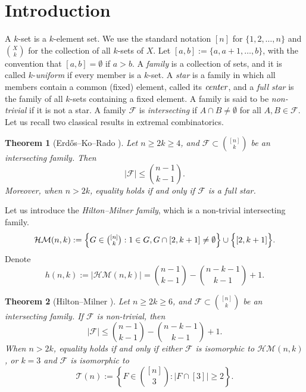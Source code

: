 \documentclass[a4paper,11pt]{article}
\newtheorem{theorem}{Theorem}[section]
\newcommand{\m}{\mathcal}
\begin{document}






\section{Introduction}
A $k$-set is a $k$-element set. 
We use the standard notation $[n]$ for $\{1,2,\dots,n\}$ and  ${X\choose k}$ for the collection of all $k$-sets of $X$. 
Let $[a,b]:=\{a, a+1, \dots, b\}$, with the convention that $[a,b]=\emptyset$ if $a>b$.  
A {\it family} is a collection of sets, and it is called $k$-{\it uniform} if every member is a $k$-set. 
A {\it star} is a family in which all members contain a common (fixed) element, called its ${\it center}$, and
a {\it full star} is the family of all $k$-sets containing a fixed element. 
A family is said to be {\it non-trivial} if it is not a star. 
A family $\m F$ is {\it intersecting} if $A\cap B\ne \emptyset$ for all $A, B \in \m F$. 
Let us recall two classical results in extremal combinatorics. 
 
\begin{theorem}[Erd\H{o}s--Ko--Rado \cite{EKR1961}]
Let $n\ge 2k\ge 4$,  and $\mathcal{F}\subset {[n] \choose k}$ be an intersecting family. Then
$$  |\mathcal{F}| \le {n-1 \choose k-1}.$$
 Moreover, when $n>2k$, equality holds if and only if $\mathcal{F}$ is a full star.
\end{theorem}

Let us introduce the {\it Hilton--Milner family}, which is a non-trivial intersecting family.  
\[ \begin{matrix}
\m {HM}(n,k):=
\Bigl\{G\in {[n] \choose k}: 
1\in G, G\cap [2,k+1] \neq \emptyset \Bigr\}
\cup \Bigl\{ [2,k+1]  \Bigr\}.
\end{matrix} \]
Denote 
\[
h(n,k):=|\m {HM}(n,k)|={n-1 \choose k-1} -{n-k-1 \choose k-1} +1.
\]



\begin{theorem}[Hilton--Milner \cite{HM1967}]\label{hm-nontrivial}
Let $n\ge 2k\ge 6$, and $\mathcal{F}\subset {[n] \choose k}$ be 
an intersecting  family.
 If  $\mathcal{F}$  is non-trivial,  then
$$ |\mathcal{F}| \le {n-1 \choose k-1} -{n-k-1 \choose k-1} +1.$$
When $n>2k$, equality holds if and only if either $\mathcal F$ is isomorphic to $\mathcal{HM}(n,k)$, or $k=3$ and $\mathcal F$ is isomorphic to 
\[\m T(n):=\left\{F\in\binom{[n]}3:|F\cap[3]|\ge2\right\}.\]
\end{theorem}
\end{document}
